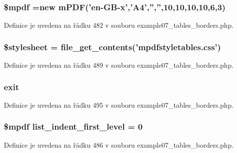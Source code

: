 \hypertarget{example07__tables__borders_8php_ad028f81910d6cbab9b184d2214b3a8f8}{
\subsubsection[{\$mpdf}]{\setlength{\rightskip}{0pt plus 5cm}\$mpdf =new {\bf m\-P\-D\-F}('en-\/G\-B-\/x','A4','','',10,10,10,10,6,3)}}\label{example07__tables__borders_8php_ad028f81910d6cbab9b184d2214b3a8f8}


Definice je uvedena na řádku 482 v souboru example07\-\_\-tables\-\_\-borders.\-php.

\hypertarget{example07__tables__borders_8php_a19e5cf73e817c55a49205e6ec78c88a8}{
\subsubsection[{\$stylesheet}]{\setlength{\rightskip}{0pt plus 5cm}\$stylesheet = file\-\_\-get\-\_\-contents('mpdfstyletables.\-css')}}\label{example07__tables__borders_8php_a19e5cf73e817c55a49205e6ec78c88a8}


Definice je uvedena na řádku 489 v souboru example07\-\_\-tables\-\_\-borders.\-php.

\hypertarget{example07__tables__borders_8php_a6733eb5f605d09eaede9845835d71c4e}{
\subsubsection[{exit}]{\setlength{\rightskip}{0pt plus 5cm}exit}}\label{example07__tables__borders_8php_a6733eb5f605d09eaede9845835d71c4e}


Definice je uvedena na řádku 495 v souboru example07\-\_\-tables\-\_\-borders.\-php.

\hypertarget{example07__tables__borders_8php_a8780612514d14375709d0685d189579e}{
\subsubsection[{list\-\_\-indent\-\_\-first\-\_\-level}]{\setlength{\rightskip}{0pt plus 5cm}\$mpdf list\-\_\-indent\-\_\-first\-\_\-level = 0}}\label{example07__tables__borders_8php_a8780612514d14375709d0685d189579e}


Definice je uvedena na řádku 486 v souboru example07\-\_\-tables\-\_\-borders.\-php.

